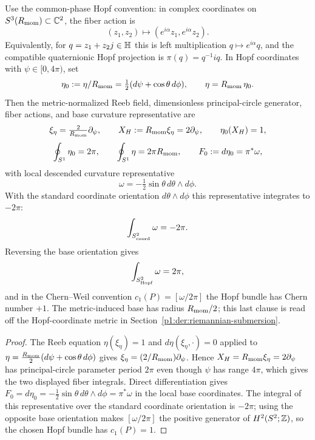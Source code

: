 \documentclass[11pt]{article}
\begin{document}
\begin{proposition}
\label{p1:prop:contact-normalization}
Use the common-phase Hopf convention: in complex coordinates on
$S^3(R_{\mathrm{mom}})\subset\mathbb{C}^2$, the fiber action is
\[
(z_1,z_2)\longmapsto(e^{i\alpha}z_1,e^{i\alpha}z_2).
\]
Equivalently, for $q=z_1+z_2j\in\mathbb{H}$ this is left multiplication
$q\mapsto e^{i\alpha}q$, and the compatible quaternionic Hopf projection is
$\pi(q)=q^{-1}iq$.  In Hopf coordinates with $\psi\in[0,4\pi)$, set
\[
\eta_0:=\eta/R_{\mathrm{mom}}=\tfrac12(d\psi+\cos\theta\,d\phi),
\qquad
\eta=R_{\mathrm{mom}}\,\eta_0.
\]
Then the metric-normalized Reeb field, dimensionless principal-circle generator,
fiber actions, and base curvature representative are
\[
\xi_\eta=\tfrac{2}{R_{\mathrm{mom}}}\partial_\psi,
\qquad
X_H:=R_{\mathrm{mom}}\xi_\eta=2\partial_\psi,
\qquad
\eta_0(X_H)=1,
\]
\[
\oint_{S^1}\eta_0=2\pi,
\qquad
\oint_{S^1}\eta=2\pi R_{\mathrm{mom}},
\qquad
F_0:=d\eta_0=\pi^*\omega,
\]
with local descended curvature representative
\[
\omega=-\tfrac12\sin\theta\,d\theta\wedge d\phi.
\]
With the standard coordinate orientation \(d\theta\wedge d\phi\) this representative integrates to \(-2\pi\):
\[
\int_{S^2_{\rm coord}}\omega=-2\pi.
\]
Reversing the base orientation gives
\[
\int_{S^2_{\rm Hopf}}\omega=2\pi,
\]
and in the Chern--Weil convention
$c_1(P)=[\omega/2\pi]$ the Hopf bundle has Chern number $+1$.  The metric-induced base has radius $R_{\mathrm{mom}}/2$; this last clause is read off the Hopf-coordinate metric in Section~\ref{p1:der:riemannian-submersion}.
\end{proposition}

\begin{proof}
The Reeb equation $\eta(\xi_\eta)=1$ and $d\eta(\xi_\eta,\cdot)=0$ applied to
$\eta=\frac{R_{\mathrm{mom}}}{2}(d\psi+\cos\theta\,d\phi)$ gives
$\xi_\eta=(2/R_{\mathrm{mom}})\partial_\psi$.  Hence
$X_H=R_{\mathrm{mom}}\xi_\eta=2\partial_\psi$ has principal-circle parameter period
$2\pi$ even though $\psi$ has range $4\pi$, which gives the two displayed fiber integrals.  Direct differentiation gives
$F_0=d\eta_0=-\frac12\sin\theta\,d\theta\wedge d\phi=\pi^*\omega$ in the local base coordinates.  The integral of this representative over the standard coordinate orientation is $-2\pi$; using the opposite base orientation makes $[\omega/2\pi]$ the positive generator of $H^2(S^2;\mathbb{Z})$, so the chosen Hopf bundle has $c_1(P)=1$.
\end{proof}
\end{document}
